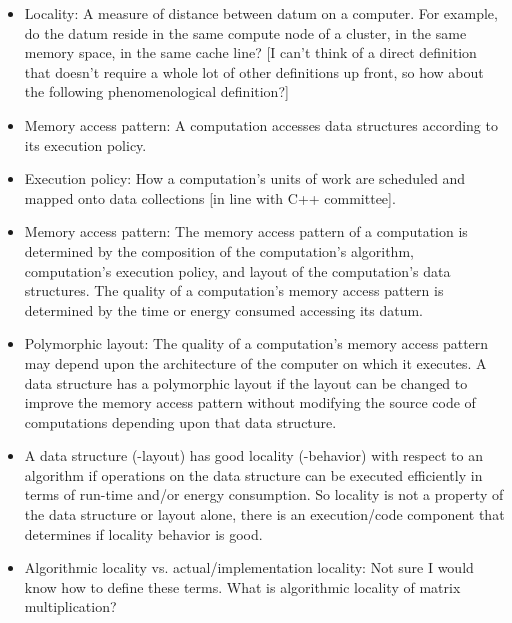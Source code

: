 \begin{itemize}
\begin{itemize}
  \item  Locality: A measure of distance between datum on a computer.  For example, do the datum reside in the same compute node of a cluster, in the same memory space, in the same cache line?  [I can't think of a direct definition that doesn't require a whole lot of other definitions up front, so how about the following phenomenological definition?]

  \item Memory access pattern: A computation accesses data structures according to its execution policy. 

  \item Execution policy: How a computation's units of work are scheduled and mapped onto data collections [in line with C++ committee].

  \item Memory access pattern: The memory access pattern of a computation is determined by the composition of the computation's algorithm, computation's execution policy, and layout of the computation's data structures.  The quality of a computation's memory access pattern is determined by the time or energy consumed accessing its datum.  

  \item Polymorphic layout: The quality of a computation's memory access pattern may depend upon the architecture of the computer on which it executes.  A data structure has a polymorphic layout if the layout can be changed to improve the memory access pattern without modifying the source code of computations depending upon that data structure.

  \item A data structure (-layout) has good locality (-behavior) with respect to an algorithm if operations on the data structure can be executed efficiently in terms of run-time and/or energy consumption. So locality is not a property of the data structure or layout alone, there is an execution/code component that determines if locality behavior is good.

  \item Algorithmic locality vs. actual/implementation locality: Not sure I would know how to define these terms. What is algorithmic locality of matrix multiplication? 


\end{itemize}
\end{itemize}
